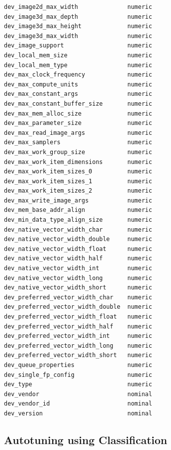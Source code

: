 \begin{multicols}{2}
\begin{Verbatim}[fontsize=\footnotesize]
dev_image2d_max_width              numeric
dev_image3d_max_depth              numeric
dev_image3d_max_height             numeric
dev_image3d_max_width              numeric
dev_image_support                  numeric
dev_local_mem_size                 numeric
dev_local_mem_type                 numeric
dev_max_clock_frequency            numeric
dev_max_compute_units              numeric
dev_max_constant_args              numeric
dev_max_constant_buffer_size       numeric
dev_max_mem_alloc_size             numeric
dev_max_parameter_size             numeric
dev_max_read_image_args            numeric
dev_max_samplers                   numeric
dev_max_work_group_size            numeric
dev_max_work_item_dimensions       numeric
dev_max_work_item_sizes_0          numeric
dev_max_work_item_sizes_1          numeric
dev_max_work_item_sizes_2          numeric
dev_max_write_image_args           numeric
dev_mem_base_addr_align            numeric
dev_min_data_type_align_size       numeric
dev_native_vector_width_char       numeric
dev_native_vector_width_double     numeric
dev_native_vector_width_float      numeric
dev_native_vector_width_half       numeric
dev_native_vector_width_int        numeric
dev_native_vector_width_long       numeric
dev_native_vector_width_short      numeric
dev_preferred_vector_width_char    numeric
dev_preferred_vector_width_double  numeric
dev_preferred_vector_width_float   numeric
dev_preferred_vector_width_half    numeric
dev_preferred_vector_width_int     numeric
dev_preferred_vector_width_long    numeric
dev_preferred_vector_width_short   numeric
dev_queue_properties               numeric
dev_single_fp_config               numeric
dev_type                           numeric
dev_vendor                         nominal
dev_vendor_id                      nominal
dev_version                        nominal
\end{Verbatim}
\end{multicols}

\subsection{Autotuning using Classification}




